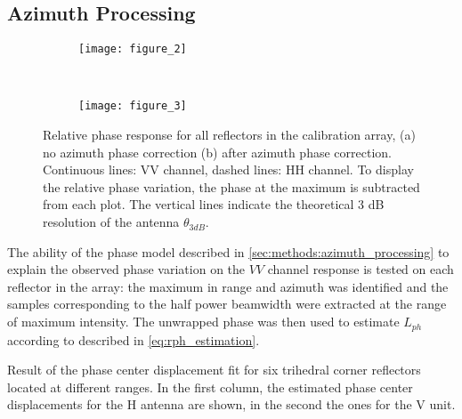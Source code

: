 \subsection{Azimuth Processing}\label{sec:results:azimuth_processing}
\begin{figure}[Ht!]
	\centering
	\begin{subfigure}[t]{\columnwidth}
		\centering
		\texttt{[image: figure\_2]}
		\subcaption{}
		\label{fig:phase_response_VV:uncorrected}
	\end{subfigure}\\
	\begin{subfigure}[t]{\columnwidth}
		\centering
		\texttt{[image: figure\_3]}
		\subcaption{}
		\label{fig:phase_response_VV:corrected}
	\end{subfigure}
	\caption{Relative phase response for all reflectors in the calibration array, (a) no azimuth phase correction (b) after azimuth phase correction. Continuous lines: VV channel, dashed lines: HH channel. To display the relative phase variation, the phase at the maximum is subtracted from each plot. The vertical lines indicate the theoretical 3 dB resolution of the antenna $\theta_{3dB}$.}
	\label{fig:phase_response_VV}
\end{figure}
The ability of the phase model described in \autoref{sec:methods:azimuth_processing} to explain the observed phase variation  on the $VV$ channel response is tested on each reflector in the array: the maximum in range and azimuth was identified and the samples corresponding to the half power beamwidth were extracted at the range of maximum intensity. The unwrapped phase was then used to estimate $L_{ph}$ according to described in \eqref{eq:rph_estimation}.
\begin{table}[Ht!]
	\centering
	\caption{Result of the phase center displacement fit for six trihedral corner reflectors located at different ranges. In the first column, the estimated phase center displacements for the H antenna are shown, in the second the ones for the V unit.}
	\label{tab:rph_fit}
\end{table}
